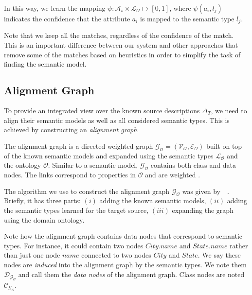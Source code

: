 \documentclass[letterpaper]{article} %
\newcommand{\authornote}[3]{
  {\fbox{\sc 
  #1}:$\blacktriangleright$\textcolor{#2}{\small{#3}}$\blacktriangleleft$}%
}
\newcommand{\ddg}[1]{\authornote{DDG}{blue}{#1}}
\newcommand{\npr}[1]{\authornote{NPR}{orange}{#1}}
\newcommand{\citeasnoun}[1]{\citeauthor{#1}~\shortcite{#1}}
\begin{document}
In this way, we learn the mapping $\psi : \mathcal{A}_s \times \mathcal{L_O} 
\mapsto [0, 1]$,
where $\psi(a_i,l_j)$ indicates the confidence that the attribute $a_i$ is 
mapped to the semantic type $l_j$.

Note that we keep all the matches, regardless of the confidence of the match. 
This is an important difference between our system and other approaches 
\cite{taheriyan2016learning} that 
remove some of the matches based on heuristics in order to simplify the task of 
finding the semantic model. 



\subsection{Alignment Graph}

To provide an integrated view over the known source descriptions $\Delta_T$, we 
need to align their semantic models as well as all considered semantic 
types. 
This is achieved by constructing an \emph{alignment graph}. 

The alignment graph is a directed weighted graph $\mathcal{G_O} = 
(\mathcal{V_O},\mathcal{E_O})$ built on top 
of the known semantic models and expanded using the semantic types 
$\mathcal{L_O}$ and the ontology $\mathcal{O}$. 
Similar to a semantic 
model, $\mathcal{G_O}$ contains both class and data nodes.
The links correspond 
to properties in  $\mathcal{O}$ and are weighted \cite{taheriyan2016learning}.

The algorithm we use to construct the alignment graph 
$\mathcal{G_O}$ was given by~\citeasnoun{taheriyan2016learning}.
Briefly, it has three parts:
$(i)$ %
adding the known semantic models,
$(ii)$ %
adding the semantic types learned for the target source,
$(iii)$ expanding the graph using the domain ontology.

Note how the alignment graph contains data nodes that correspond to semantic types. 
For instance, it could contain two nodes $City.name$ and $State.name$ rather than just one node $name$ connected to two 
nodes $City$ and $State$. 
We say these nodes are \emph{induced} into the 
alignment graph by the semantic types.
We note them $\mathcal{D_{G_O}}$ and call them the \emph{data nodes} of the alignment graph.
Class nodes are noted $\mathcal{C_{G_O}}$.
\end{document}
